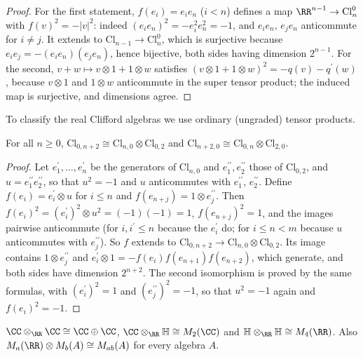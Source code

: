 \begin{proof}
For the first statement, $f(e_i) = e_ie_n$ ($i < n$) defines a map $\RR^{n-1} \to \mathrm{Cl}_n^0$ with $f(v)^2 = -|v|^2$: indeed $(e_ie_n)^2 = -e_i^2e_n^2 = -1$, and $e_ie_n$, $e_je_n$ anticommute for $i \neq j$. It extends to
$\mathrm{Cl}_{n-1} \to \mathrm{Cl}_n^0$, which is surjective because $e_ie_j = -(e_ie_n)(e_je_n)$, hence bijective, both sides having dimension $2^{n-1}$. For the second, $v + w \mapsto v \otimes 1 + 1 \otimes w$ satisfies
$(v \otimes 1 + 1 \otimes w)^2 = -q(v) - q^{\prime}(w)$, because $v \otimes 1$ and $1 \otimes w$ anticommute in the super tensor product; the induced map is surjective, and dimensions agree.
\end{proof}

To classify the real Clifford algebras we use ordinary (ungraded) tensor products.

\begin{lemma}\label{spin-geometry:lemma-periodicity-isomorphisms}
For all $n \geq 0$, $\mathrm{Cl}_{0,n+2} \cong \mathrm{Cl}_{n,0} \otimes \mathrm{Cl}_{0,2}$ and $\mathrm{Cl}_{n+2,0} \cong \mathrm{Cl}_{0,n} \otimes \mathrm{Cl}_{2,0}$.
\end{lemma}

\begin{proof}
Let $e^{\prime}_1, \ldots, e^{\prime}_n$ be the generators of $\mathrm{Cl}_{n,0}$ and $e^{\prime\prime}_1, e^{\prime\prime}_2$ those of $\mathrm{Cl}_{0,2}$, and $u = e^{\prime\prime}_1e^{\prime\prime}_2$, so that $u^2 = -1$ and $u$ anticommutes with
$e^{\prime\prime}_1$, $e^{\prime\prime}_2$. Define $f(e_i) = e^{\prime}_i \otimes u$ for $i \leq n$ and $f(e_{n+j}) = 1 \otimes e^{\prime\prime}_j$. Then $f(e_i)^2 = (e^{\prime}_i)^2 \otimes u^2 = (-1)(-1) = 1$, $f(e_{n+j})^2 = 1$, and the images
pairwise anticommute (for $i, i^{\prime} \leq n$ because the $e^{\prime}_i$ do; for $i \leq n < m$ because $u$ anticommutes with $e^{\prime\prime}_j$). So $f$ extends to $\mathrm{Cl}_{0,n+2} \to \mathrm{Cl}_{n,0} \otimes \mathrm{Cl}_{0,2}$. Its image
contains $1 \otimes e^{\prime\prime}_j$ and $e^{\prime}_i \otimes 1 = -f(e_i)f(e_{n+1})f(e_{n+2})$, which generate, and both sides have dimension $2^{n+2}$. The second isomorphism is proved by the same formulas, with
$(e^{\prime}_i)^2 = 1$ and $(e^{\prime\prime}_j)^2 = -1$, so that $u^2 = -1$ again and $f(e_i)^2 = -1$.
\end{proof}

\begin{lemma}\label{spin-geometry:lemma-tensor-division-algebras}
$\CC \otimes_\RR \CC \cong \CC \oplus \CC$, $\CC \otimes_\RR \mathbb{H} \cong M_2(\CC)$ and $\mathbb{H} \otimes_\RR \mathbb{H} \cong M_4(\RR)$. Also $M_a(\RR) \otimes M_b(A) \cong M_{ab}(A)$ for every algebra $A$.
\end{lemma}

